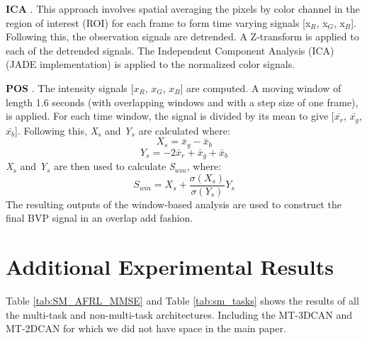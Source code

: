 \documentclass{article}
\begin{document}
\textbf{ICA} \citep{poh2010non}. This approach involves spatial averaging the pixels by color channel in the region of interest (ROI) for each frame to form time varying signals [x$_{R}$, x$_{G}$, x$_{B}$]. Following this, the
observation signals are detrended. A
Z-transform is applied to each of the detrended signals. The Independent Component Analysis (ICA) (JADE implementation) is applied to the normalized color signals. 

\textbf{POS} \citep{wang2016algorithmic}. The intensity signals [\begin{math}x_R\end{math}, \begin{math}x_G\end{math}, \begin{math}x_B\end{math}] are computed. A moving window of length 1.6 seconds (with overlapping windows and with a step size of one frame), is applied. For each time window, the signal is divided by its mean to give [\begin{math}\bar{x_r}\end{math}, \begin{math}\bar{x_g}\end{math}, \begin{math}\bar{x_b}\end{math}]. Following this, \textit{X$_s$} and \textit{Y$_s$} are calculated where:
\begin{equation}
    X_s = \bar{x}_g - \bar{x}_b
\end{equation}
\begin{equation}
    Y_s = -2\bar{x}_r + \bar{x}_g + \bar{x}_b
\end{equation}
\textit{X$_s$} and \textit{Y$_s$} are then used to calculate \textit{S}$_{win}$, where:
\begin{equation}
    S_{win} = X_s + \frac{\sigma(X_s)}{\sigma(Y_s)}Y_s
\end{equation}
The resulting outputs of the window-based analysis are used to construct the final BVP signal in an overlap add fashion.

\section{Additional Experimental Results}

Table \ref{tab:SM_AFRL_MMSE} and Table \ref{tab:sm_tasks} shows the results of all the multi-task and non-multi-task architectures. Including the MT-3DCAN and MT-2DCAN for which we did not have space in the main paper.
\end{document}
